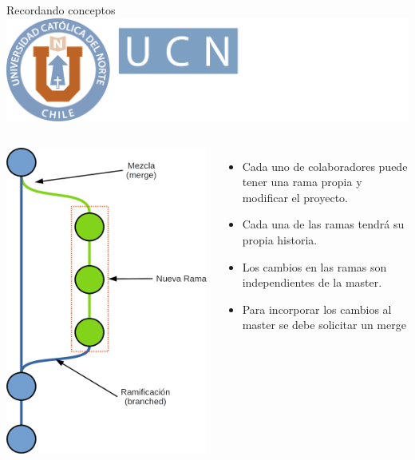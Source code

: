 \documentclass[12pt,a4paper,usenames,x11names,compress]{beamer}
\begin{document}
\begin{frame}{Recordando conceptos\hfill \includegraphics[scale=.1]{eciem.png}}
\begin{columns}
\includegraphics[scale=.22]{commit_rama.png} 
\begin{itemize}
\justifying
 \item Cada uno de colaboradores puede tener una rama propia y modificar el proyecto.
 \item Cada una de las ramas tendrá su propia historia.
 \item Los cambios en las ramas son independientes de la master.
 \item Para incorporar los cambios al master se debe solicitar un merge
\end{itemize}
\end{columns}
\end{frame}
\end{document}
